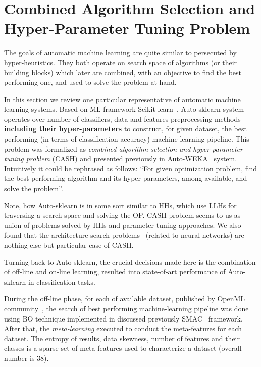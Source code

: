 \section{Combined Algorithm Selection and Hyper-Parameter Tuning Problem}\label{bg: section cash}
The goals of automatic machine learning are quite similar to persecuted by hyper-heuristics. They both operate on search space of algorithms (or their building blocks) which later are combined, with an objective to find the best performing one, and used to solve the problem at hand. 

In this section we review one particular representative of automatic machine learning systems.
Based on ML framework Scikit-learn~\cite{scikit-learn}, Auto-sklearn system~\cite{feurer2015efficient} operates over number of classifiers, data and features preprocessing methods \textbf{including their hyper-parameters} to construct, for given dataset, the best performing (in terms of classification accuracy) machine learning pipeline.
This problem was formalized as \textit{combined algorithm selection and hyper-parameter tuning problem} (CASH) and presented previously in Auto-WEKA~\cite{thornton2013auto} system. Intuitively it could be rephrased as follows: ``For given optimization problem, find the best performing algorithm and its hyper-parameters, among available, and solve the problem''. 

Note, how Auto-sklearn is in some sort similar to HHs, which use LLHs for traversing a search space and solving the OP. 
CASH problem seems to us as union of problems solved by HHs and parameter tuning approaches. We also found that the architecture search problems~\cite{elsken2018neural} (related to neural networks) are nothing else but particular case of CASH.


Turning back to Auto-sklearn, the crucial decisions made here is the combination of off-line and on-line learning, resulted into state-of-art performance of Auto-sklearn in classification tasks.

During the off-line phase, for each of available dataset, published by OpenML community~\cite{OpenMLPython2019}, the search of best performing machine-learning pipeline was done using BO technique implemented in discussed previously SMAC~\cite{hutter2011sequential} framework.
After that, the \textit{meta-learning} executed to conduct the meta-features for each dataset. The entropy of results, data skewness, number of features and their classes is a sparse set of meta-features used to characterize a dataset (overall number is 38).

